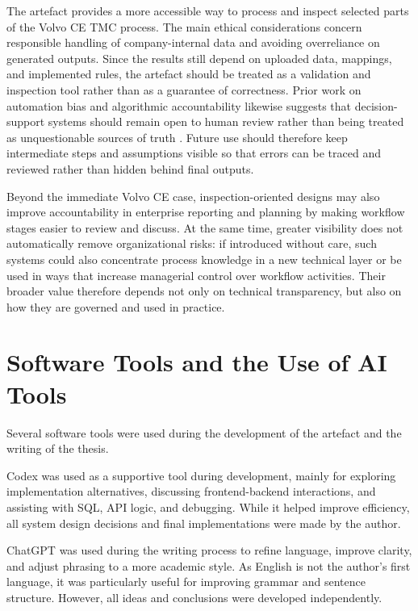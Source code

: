 The artefact provides a more accessible way to process and inspect selected parts of the Volvo CE TMC process. The main ethical considerations concern responsible handling of company-internal data and avoiding overreliance on generated outputs. Since the results still depend on uploaded data, mappings, and implemented rules, the artefact should be treated as a validation and inspection tool rather than as a guarantee of correctness. Prior work on automation bias and algorithmic accountability likewise suggests that decision-support systems should remain open to human review rather than being treated as unquestionable sources of truth \cite{parasuraman1997humans,martin2019ethics}. Future use should therefore keep intermediate steps and assumptions visible so that errors can be traced and reviewed rather than hidden behind final outputs.

Beyond the immediate Volvo CE case, inspection-oriented designs may also improve accountability in enterprise reporting and planning by making workflow stages easier to review and discuss. At the same time, greater visibility does not automatically remove organizational risks: if introduced without care, such systems could also concentrate process knowledge in a new technical layer or be used in ways that increase managerial control over workflow activities. Their broader value therefore depends not only on technical transparency, but also on how they are governed and used in practice.



\section{Software Tools and the Use of AI Tools}

Several software tools were used during the development of the artefact and the writing of the thesis.

Codex was used as a supportive tool during development, mainly for exploring implementation alternatives, discussing frontend-backend interactions, and assisting with SQL, API logic, and debugging. While it helped improve efficiency, all system design decisions and final implementations were made by the author.

ChatGPT was used during the writing process to refine language, improve clarity, and adjust phrasing to a more academic style. As English is not the author's first language, it was particularly useful for improving grammar and sentence structure. However, all ideas and conclusions were developed independently.

